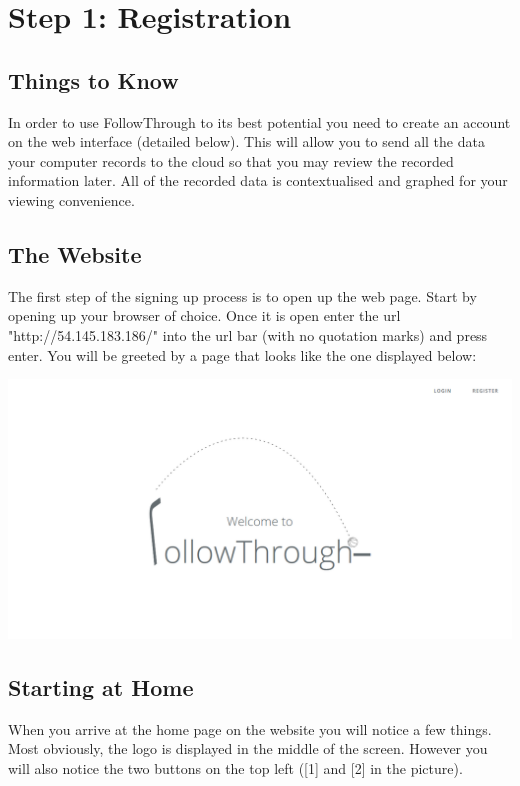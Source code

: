 \chapter{Step 1: Registration}

\setlength{\parindent}{0cm}

\section{Things to Know}
In order to use FollowThrough to its best potential you need to create an account on the web interface (detailed below). This will allow you to send all the data your computer records to the cloud so that you may review the recorded information later. All of the recorded data is contextualised and graphed for your viewing convenience.

\section{The Website}
The first step of the signing up process is to open up the web page. Start by opening up your browser of choice. Once it is open enter the url "http://54.145.183.186/" into the url bar (with no quotation marks) and press enter. You will be greeted by a page that looks like the one displayed below:
\begin{center}
    \includegraphics[width = 1 \textwidth]{Pieces/home.PNG}
\end{center}

\section{Starting at Home}
When you arrive at the home page on the website you will notice a few things. Most obviously, the logo is displayed in the middle of the screen. However you will also notice the two buttons on the top left ([1] and [2] in the picture).

